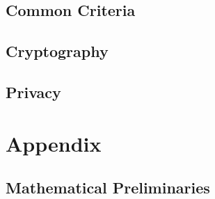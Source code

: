 \documentclass{book}
\begin{document}
  \chapter{Common Criteria}

  \chapter{Cryptography}
    


  \chapter{Privacy}

%
%  

\part{Appendix}

\appendix

\chapter{Mathematical Preliminaries}\label{sec:math}


\tocentryBib


%
%
\end{document}
